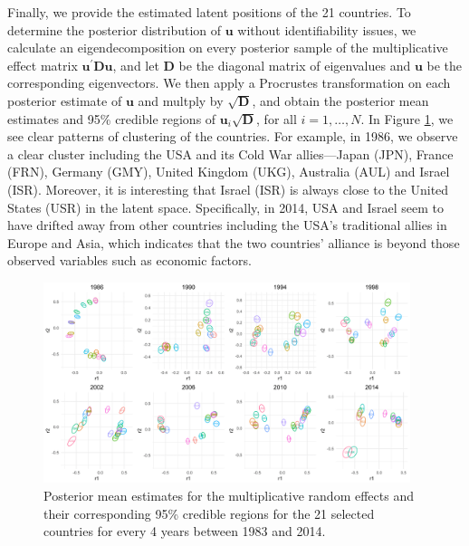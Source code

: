 \documentclass[a4paper]{article}
\begin{document}
Finally, we provide the estimated latent positions of the 21 countries. To determine the posterior distribution of $\boldsymbol{u}$ without identifiability issues, we calculate an eigendecomposition on every posterior sample of the multiplicative effect matrix $\boldsymbol{u}^\prime \mathbf{D}\boldsymbol{u}$, and let $\mathbf{D}$ be the diagonal matrix of eigenvalues and $\boldsymbol{u}$ be the corresponding eigenvectors. We then apply a Procrustes transformation on each posterior estimate of $\boldsymbol{u}$ and multply by $\sqrt{\mathbf{D}}$, and obtain the posterior mean estimates and 95\% credible regions of $\boldsymbol{u}_i\sqrt{\mathbf{D}}$, for all $i=1,\ldots, N$. In Figure \ref{figure:UDplot}, we see clear patterns of clustering of the countries. For example, in 1986, we observe a clear cluster including the USA and its Cold War allies---Japan (JPN), France (FRN), Germany (GMY), United Kingdom (UKG), Australia (AUL) and Israel (ISR). Moreover, it is interesting that Israel (ISR) is always close to the United States (USR) in the latent space. Specifically, in 2014, USA and Israel seem to have drifted away from other countries including the USA's traditional allies in Europe and Asia, which indicates that the two countries' alliance is beyond those observed variables such as economic factors.
\begin{figure}[ht]
  	\begin{center}  
  		 \includegraphics[width=0.955\textwidth]{plots_paper/UDU_reduced_8years-1.png}
  	\end{center}
  	\caption {Posterior mean estimates for the multiplicative random effects and their corresponding 95\% credible regions for the 21 selected countries for every 4 years between 1983 and 2014.  }
  	\label{figure:UDplot}
  \end{figure}
\end{document}

